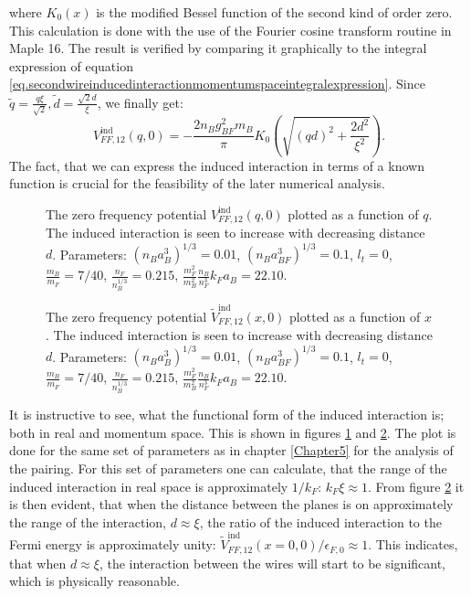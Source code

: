 where $K_0(x)$ is the modified Bessel function of the second kind of order zero. This calculation is done with the use of the Fourier cosine transform routine in Maple 16. The result is verified by comparing it graphically to the integral expression of equation \eqref{eq.secondwireinducedinteractionmomentumspaceintegralexpression}. Since $\tilde{q} = \frac{q\xi}{\sqrt{2}}, \tilde{d} = \frac{\sqrt{2}d}{\xi}$, we finally get:
 \begin{equation}
V^\text{ind}_{FF,12}(q,0) = -\frac{2n_Bg^2_{BF}m_B}{\pi}K_0\left(\sqrt{(qd)^2+\frac{2d^2}{\xi^2}}\right). 
\end{equation}
The fact, that we can express the induced interaction in terms of a known function is crucial for the feasibility of the later numerical analysis. 

\begin{figure} 
\begin{center}  
  
\caption{The zero frequency potential $V_{FF,12}^\text{ind}(q,0)$ plotted as a function of $q$. The induced interaction is seen to increase with decreasing distance $d$. Parameters: $(n_Ba_B^3)^{1/3} = 0.01$, $(n_Ba_{BF}^3)^{1/3} = 0.1$, $l_t = 0$, $\frac{m_B}{m_F} = 7/40$, $\frac{n_F}{n_B^{1/3}} = 0.215$, $\frac{m_F^2}{m_B^2}\frac{n_B}{n_F^3} k_Fa_B = 22.10$.}  
\label{fig.VFF12indq}  
\end{center}    
\end{figure}

\begin{figure} 
\begin{center}  
  
\caption{The zero frequency potential $\tilde{V}_{FF,12}^\text{ind}(x,0)$ plotted as a function of $x$. The induced interaction is seen to increase with decreasing distance $d$. Parameters: $(n_Ba_B^3)^{1/3} = 0.01$, $(n_Ba_{BF}^3)^{1/3} = 0.1$, $l_t = 0$, $\frac{m_B}{m_F} = 7/40$, $\frac{n_F}{n_B^{1/3}} = 0.215$, $\frac{m_F^2}{m_B^2}\frac{n_B}{n_F^3} k_Fa_B = 22.10$.}  
\label{fig.VFF12indx}  
\end{center}    
\end{figure}

It is instructive to see, what the functional form of the induced interaction is; both in real and momentum space.  This is shown in figures \ref{fig.VFF12indq} and \ref{fig.VFF12indx}. The plot is done for the same set of parameters as in chapter \ref{Chapter5} for the analysis of the pairing. For this set of parameters one can calculate, that the range of the induced interaction in real space is approximately $1/k_F$: $k_F\xi \approx 1$. From figure \ref{fig.VFF12indx} it is then evident, that when the distance between the planes is on approximately the range of the interaction, $d\approx \xi$, the ratio of the induced interaction to the Fermi energy is approximately unity: $\tilde{V}_{FF,12}^\text{ind}(x=0,0)/\epsilon_{F,0} \approx 1$. This indicates, that when $d \approx \xi$, the interaction between the wires will start to be significant, which is physically reasonable.  




